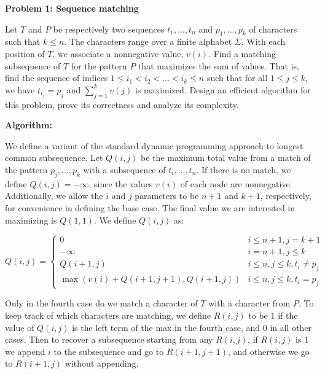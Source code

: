 \documentclass[letterpaper,12pt]{article}
\def\name{Jimmy Ye}
\def\id{A12405090}
\begin{document}
\newlength{\boxwidth}
\setlength{\boxwidth}{\textwidth}
\addtolength{\boxwidth}{-2cm}
\noindent\framebox[\textwidth]{\hfil
\parbox[t]{\boxwidth}{%
{\bfseries CSE 202 \hfill Fall 2017}
\begin{center}\Large Final\end{center}
\name\hfill\id%
}\hfil}
\vspace{0.7cm}

\noindent\textbf{Problem 1: Sequence matching}

Let $T$ and $P$ be respectively two sequences $t_1,...,t_n$ and $p_1,...,p_k$ of
characters such that $k \leq n$. The characters range over a finite alphabet $\Sigma$.
With each position of $T$, we associate a nonnegative value, $v(i)$. Find a
matching subsequence of $T$ for the pattern $P$ that maximizes the sum of
values. That is, find the sequence of indices $1 \leq i_1 < i_2 < ... < i_k \leq n$
such that for all $1 \leq j \leq k$, we have $t_{i_{j}} = p_j$ and $\sum_{j=1}^k v(j)$ is
maximized. Design an efficient algorithm for this problem, prove its correctness
and analyze its complexity.

\vspace{2mm}
\textbf{Algorithm:}

We define a variant of the standard dynamic programming approach to longest
common subsequence. Let $Q(i,j)$ be the maximum total value from a match of the
pattern $p_j,...,p_k$ with a subsequence of $t_i,...,t_n$. If there is no match,
we define $Q(i,j) = -\infty$, since the values $v(i)$ of each node are nonnegative.
Additionally, we allow the $i$ and $j$ parameters to be $n + 1$ and $k + 1$,
respectively, for convenience in defining the base case. The final value we are
interested in maximizing is $Q(1,1)$. We define $Q(i,j)$ as:

\[
  Q(i,j) = \begin{cases}
    0 & i \leq n+1, j = k + 1 \\
    -\infty & i = n+1, j \leq k \\
    Q(i+1, j) & i \leq n, j \leq k, t_i \neq p_j \\
    \max (v(i) + Q(i+1, j+1), Q(i+1, j)) & i \leq n, j \leq k, t_i = p_j
  \end{cases}
\]

Only in the fourth case do we match a character of $T$ with a character from
$P$. To keep track of which characters are matching, we define $R(i,j)$ to be 1
if the value of $Q(i,j)$ is the left term of the max in the fourth case, and 0
in all other cases. Then to recover a subsequence starting from any $R(i,j)$, if
$R(i,j)$ is 1 we append $i$ to the subsequence and go to $R(i+1, j+1)$, and
otherwise we go to $R(i+1, j)$ without appending.
\end{document}
